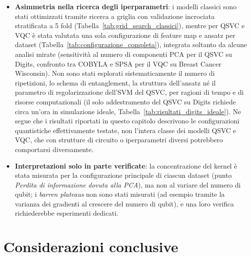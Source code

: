 \begin{itemize}
    \item \textbf{Asimmetria nella ricerca degli iperparametri}: i modelli classici sono stati ottimizzati tramite ricerca a griglia con validazione incrociata stratificata a 5 fold (Tabella~\ref{tab:grid_search_classici}), mentre per QSVC e VQC è stata valutata una sola configurazione di feature map e ansatz per dataset (Tabella~\ref{tab:configurazione_completa}), integrata soltanto da alcune analisi mirate (sensitività al numero di componenti PCA per il QSVC su Digits, confronto tra COBYLA e SPSA per il VQC su Breast Cancer Wisconsin). Non sono stati esplorati sistematicamente il numero di ripetizioni, lo schema di entanglement, la struttura dell'ansatz né il parametro di regolarizzazione dell'SVM del QSVC, per ragioni di tempo e di risorse computazionali (il solo addestramento del QSVC su Digits richiede circa un'ora in simulazione ideale, Tabella~\ref{tab:risultati_digits_ideale}). Ne segue che i risultati riportati in questo capitolo descrivono le configurazioni quantistiche effettivamente testate, non l'intera classe dei modelli QSVC e VQC, che con strutture di circuito o iperparametri diversi potrebbero comportarsi diversamente.

    \item \textbf{Interpretazioni solo in parte verificate}: la concentrazione del kernel è stata misurata per la configurazione principale di ciascun dataset (punto \textit{Perdita di informazione dovuta alla PCA}), ma non al variare del numero di qubit; i \textit{barren plateaus} non sono stati misurati (ad esempio tramite la varianza dei gradienti al crescere del numero di qubit), e una loro verifica richiederebbe esperimenti dedicati.
\end{itemize}

\section{Considerazioni conclusive}
\label{sec:considerazioni_conclusive_implementazione}

